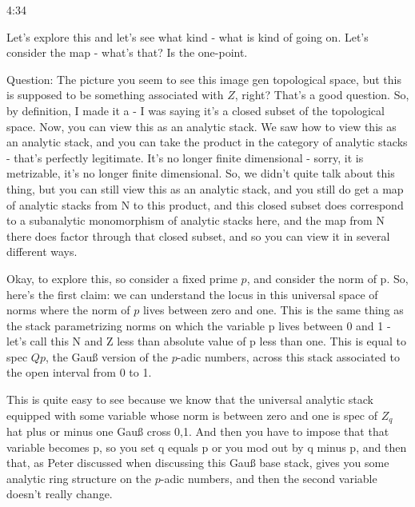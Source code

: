 \begin{unfinished}{4:34}
\begin{example}
Let's explore this and let's see what kind - what is kind of going on. Let's consider the map - what's that? Is the one-point.

Question: The picture you seem to see this image gen topological space, but this is supposed to be something associated with $Z$, right? That's a good question. So, by definition, I made it a - I was saying it's a closed subset of the topological space. Now, you can view this as an analytic stack. We saw how to view this as an analytic stack, and you can take the product in the category of analytic stacks - that's perfectly legitimate. It's no longer finite dimensional - sorry, it is metrizable, it's no longer finite dimensional. So, we didn't quite talk about this thing, but you can still view this as an analytic stack, and you still do get a map of analytic stacks from N to this product, and this closed subset does correspond to a subanalytic monomorphism of analytic stacks here, and the map from N there does factor through that closed subset, and so you can view it in several different ways.

Okay, to explore this, so consider a fixed prime $p$, and consider the norm of p. So, here's the first claim: we can understand the locus in this universal space of norms where the norm of $p$ lives between zero and one. This is the same thing as the stack parametrizing norms on which the variable p lives between 0 and 1 - let's call this N and Z less than absolute value of p less than one. This is equal to spec $Qp$, the Gauß version of the $p$-adic numbers, across this stack associated to the open interval from 0 to 1.

This is quite easy to see because we know that the universal analytic stack equipped with some variable whose norm is between zero and one is spec of $Z_q$ hat plus or minus one Gauß cross 0,1. And then you have to impose that that variable becomes p, so you set q equals p or you mod out by q minus p, and then that, as Peter discussed when discussing this Gauß base stack, gives you some analytic ring structure on the $p$-adic numbers, and then the second variable doesn't really change.


\end{example}
\end{unfinished}
